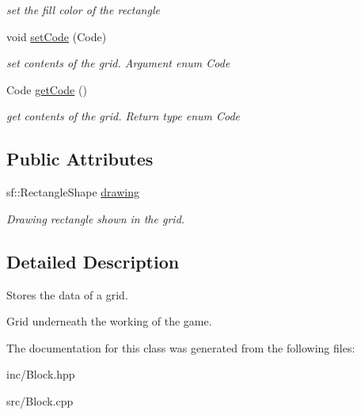 \begin{DoxyCompactItemize}
\begin{DoxyCompactList}\small\item\em set the fill color of the rectangle \end{DoxyCompactList}\item 
\hypertarget{class_block_a2615d0d4e21870e3cee8d0307e6d8e1a}{void \hyperlink{class_block_a2615d0d4e21870e3cee8d0307e6d8e1a}{set\+Code} (Code)}\label{class_block_a2615d0d4e21870e3cee8d0307e6d8e1a}

\begin{DoxyCompactList}\small\item\em set contents of the grid. Argument enum Code \end{DoxyCompactList}\item 
\hypertarget{class_block_a83638681ec45074f375441902c7bc5a4}{Code \hyperlink{class_block_a83638681ec45074f375441902c7bc5a4}{get\+Code} ()}\label{class_block_a83638681ec45074f375441902c7bc5a4}

\begin{DoxyCompactList}\small\item\em get contents of the grid. Return type enum Code \end{DoxyCompactList}\end{DoxyCompactItemize}
\subsection*{Public Attributes}
\begin{DoxyCompactItemize}
\item 
\hypertarget{class_block_a4a9442492104a28402ba5a02f2e8799d}{sf\+::\+Rectangle\+Shape \hyperlink{class_block_a4a9442492104a28402ba5a02f2e8799d}{drawing}}\label{class_block_a4a9442492104a28402ba5a02f2e8799d}

\begin{DoxyCompactList}\small\item\em Drawing rectangle shown in the grid. \end{DoxyCompactList}\end{DoxyCompactItemize}


\subsection{Detailed Description}
Stores the data of a grid. 

Grid underneath the working of the game. 

The documentation for this class was generated from the following files\+:\begin{DoxyCompactItemize}
\item 
inc/Block.\+hpp\item 
src/Block.\+cpp\end{DoxyCompactItemize}
